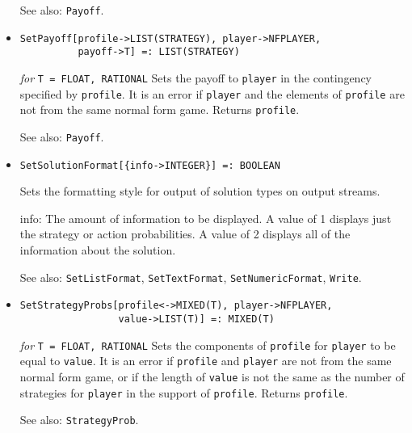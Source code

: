\begin{itemize}
{\it for} {\tt T = FLOAT, RATIONAL}
\bd
Sets the payoff of \verb+outcome+ for \verb+player+ to \verb+payoff+.
It is an error if \verb+outcome+ and \verb+player+ are not from the
same extensive form game.  Returns \verb+outcome+.
\item [See also:] \verb+Payoff+.
\ed

\item{}
\protect \large \begin{verbatim}
SetPayoff[profile->LIST(STRATEGY), player->NFPLAYER,
          payoff->T] =: LIST(STRATEGY)
\end{verbatim}\normalsize

{\it for} {\tt T = FLOAT, RATIONAL}
\bd
Sets the payoff to \verb+player+ in the contingency specified by
\verb+profile+.  It is an error if \verb+player+ and the elements
of \verb+profile+ are not from the same normal form game.
Returns \verb+profile+.
\item [See also:] \verb+Payoff+.
\ed

\item{}
\protect \large \begin{verbatim}
SetSolutionFormat[{info->INTEGER}] =: BOOLEAN
\end{verbatim}\normalsize

\bd
Sets the formatting style for output of solution types on output streams.
\bd
\item [info:] The amount of information to be displayed.  A value of 1
displays just the strategy or action probabilities.  A value of 2
displays all of the information about the solution. 
\ed
\item [See also:] \verb+SetListFormat+, \verb+SetTextFormat+, 
\verb+SetNumericFormat+, \verb+Write+.
\ed

\item{} 
\protect \large \begin{verbatim}
SetStrategyProbs[profile<->MIXED(T), player->NFPLAYER,
                 value->LIST(T)] =: MIXED(T)
\end{verbatim} \normalsize

{\it for} {\tt T = FLOAT, RATIONAL}
\bd
Sets the components of \verb+profile+ for \verb+player+ to be equal
to \verb+value+.  It is an error if \verb+profile+ and \verb+player+
are not from the same normal form game, or if the length of \verb+value+
is not the same as the number of strategies for \verb+player+ in the
support of \verb+profile+.  Returns \verb+profile+.
\item [See also:] \verb+StrategyProb+.
\ed


\end{itemize}
